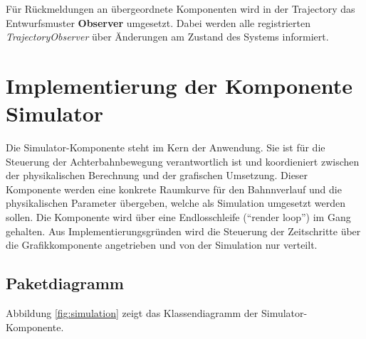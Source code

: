 Für Rückmeldungen an übergeordnete Komponenten wird in der Trajectory das Entwurfsmuster
\textbf{Observer} umgesetzt. Dabei werden alle registrierten \emph{TrajectoryObserver}
über Änderungen am Zustand des Systems informiert.

\section{Implementierung der Komponente Simulator}

Die Simulator-Komponente steht im Kern der Anwendung. Sie ist für die Steuerung der
Achterbahnbewegung verantwortlich ist und koordieniert zwischen der physikalischen 
Berechnung und der grafischen Umsetzung. Dieser Komponente werden eine konkrete 
Raumkurve für den Bahnnverlauf und die physikalischen Parameter übergeben, welche
als Simulation umgesetzt werden sollen. Die Komponente wird über eine 
Endlosschleife (``render loop'') im Gang gehalten. Aus Implementierungsgründen wird
die Steuerung der Zeitschritte über die Grafikkomponente angetrieben und von der
Simulation nur verteilt.

\subsection{Paketdiagramm}
Abbildung \ref{fig:simulation} zeigt das Klassendiagramm der Simulator-Komponente.

